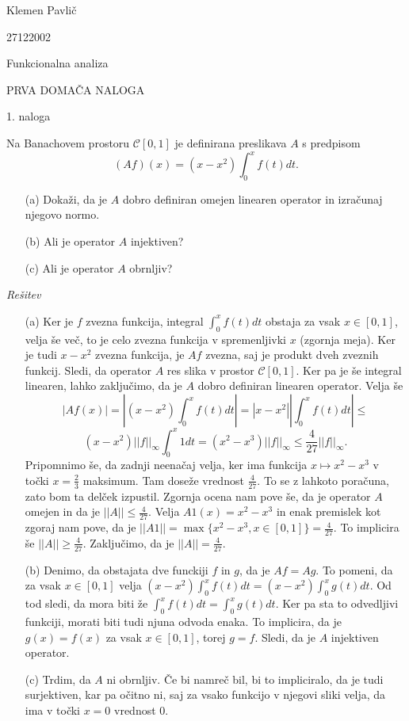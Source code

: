 \documentclass[a4paper, 12pt]{article}
\begin{document}
\begin{flushright}
Klemen Pavlič

27122002
\end{flushright}
\begin{center}
Funkcionalna analiza
\end{center}
\begin{center}
PRVA DOMAČA NALOGA
\end{center}

\begin{flushleft}
1. naloga
\end{flushleft}
Na Banachovem prostoru $\mathcal{C}[0,1]$ je definirana preslikava $A$ s predpisom
$$
(Af)(x) = (x-x^2) \int_{0}^x f(t) dt.
$$
\begin{enumerate}
\item[(a)] Dokaži, da je $A$ dobro definiran omejen linearen operator in izračunaj njegovo normo.
\item[(b)] Ali je operator $A$ injektiven?
\item[(c)] Ali je operator $A$ obrnljiv?
\end{enumerate}
\emph{Rešitev}
\begin{enumerate}
\item[(a)]Ker je $f$ zvezna funkcija, integral $\int_0^x f(t)dt$ obstaja za vsak $x\in[0,1]$, velja še več, to je celo zvezna funkcija v spremenljivki $x$ (zgornja meja). Ker je tudi $x-x^2$ zvezna funkcija, je $Af$ zvezna, saj je produkt dveh zveznih funkcij. Sledi, da operator $A$ res slika v prostor $\mathcal{C}[0,1]$. Ker pa je še integral linearen, lahko zaključimo, da je $A$ dobro definiran linearen operator. Velja še 
$$
|Af(x)| = |(x-x^2)\int_0^x f(t)dt| = |x-x^2| |\int_0^x f(t)dt| \le
$$
$$
(x-x^2)||f||_{\infty} \int_0^x 1 dt= (x^2 - x^3) ||f||_{\infty} \le \frac{4}{27} ||f||_{\infty}.
$$
Pripomnimo še, da zadnji neenačaj velja, ker ima funkcija $x\mapsto x^2 - x^3$ v točki $x=\frac{2}{3}$ maksimum. Tam doseže vrednost $\frac{4}{27}$. To se z lahkoto poračuna, zato bom ta delček izpustil.
 Zgornja ocena nam pove še, da je operator $A$ omejen in da je $||A|| \le \frac{4}{27}$. Velja $A1(x) = x^2 - x^3$ in enak premislek kot zgoraj nam pove, da je $||A1|| = \max\{x^2 - x^3, x\in[0,1]\}=\frac{4}{27}$. To implicira še $||A||\ge \frac{4}{27}$. Zaključimo, da je $||A||=\frac{4}{27}$.

\item[(b)] Denimo, da obstajata dve funckiji $f$ in $g$, da je $Af = Ag$. To pomeni, da za vsak $x\in [0,1]$ velja $(x-x^2) \int_0^x f(t)dt = (x-x^2) \int_0^xg(t)dt$. Od tod sledi, da mora biti že $\int_0^x f(t)dt = \int_0^x g(t)dt$. Ker pa sta to odvedljivi funkciji, morati biti tudi njuna odvoda enaka. To implicira, da je $g(x) = f(x)$ za vsak $x\in[0,1]$, torej $g=f$. Sledi, da je $A$ injektiven operator.

\item[(c)] Trdim, da $A$ ni obrnljiv. Če bi namreč bil, bi to impliciralo, da je tudi surjektiven, kar pa očitno ni, saj za vsako funkcijo v njegovi sliki velja, da ima v točki $x=0$ vrednost 0.
\end{enumerate}
\end{document}
